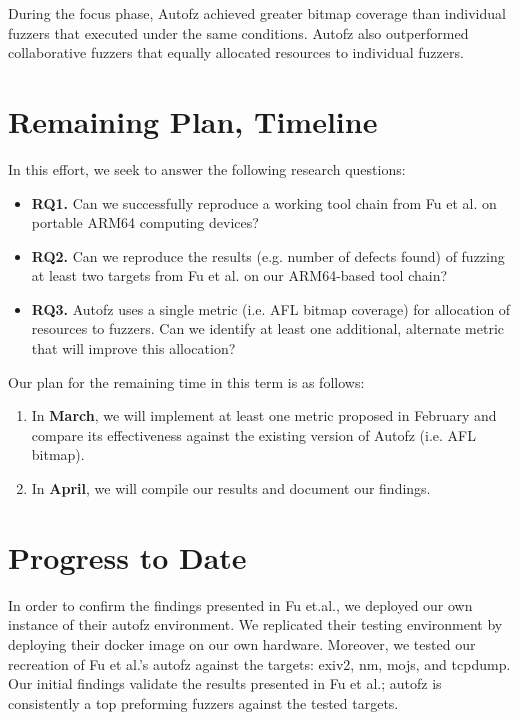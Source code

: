 During the focus phase, Autofz achieved greater bitmap coverage than individual 
fuzzers that executed under the same conditions. Autofz also outperformed 
collaborative fuzzers that equally allocated resources to individual fuzzers. 
\cite{Fu}

\section{Remaining Plan, Timeline}
In this effort, we seek to answer the following research questions:

\begin{itemize}
    \item \textbf{RQ1.} Can we successfully reproduce a working tool chain from 
    Fu et al. \cite{Fu} on portable ARM64 computing devices?
    \item \textbf{RQ2.} Can we reproduce the results (e.g. number of defects found)
     of fuzzing at least two targets from Fu et al. \cite{Fu} on our ARM64-based
      tool chain?
    \item \textbf{RQ3.} Autofz uses a single metric (i.e. AFL bitmap coverage) for
     allocation of resources to fuzzers. Can we identify at least one additional, 
     alternate metric that will improve this allocation?
\end{itemize}

Our plan for the remaining time in this term is as follows:

\begin{enumerate}
    \item In \textbf{March}, we will implement at least one metric proposed in February
     and compare its effectiveness against the existing version of Autofz (i.e. AFL bitmap).

    \item In \textbf{April}, we will compile our results and document our findings.
\end{enumerate}

\section{Progress to Date}
In order to confirm the findings presented in Fu et.al.\cite{Fu}, we deployed our own instance of 
their autofz environment. We replicated their testing environment by deploying their docker image 
on our own hardware. Moreover, we tested our recreation of Fu et al.'s autofz against the targets: 
exiv2, nm, mojs, and tcpdump. Our initial findings validate the results presented in Fu et al.; 
autofz is consistently a top preforming fuzzers against the tested targets. 

